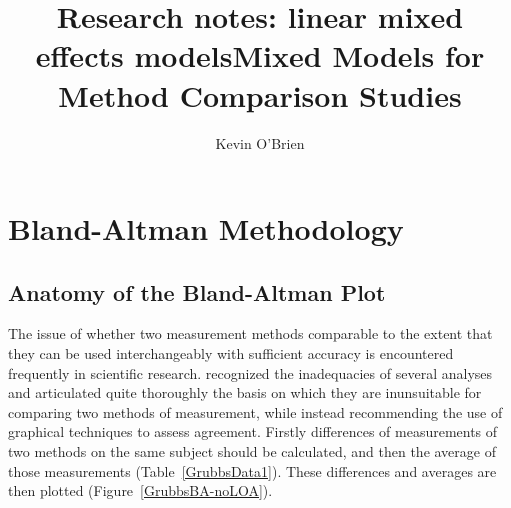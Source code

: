 \documentclass[12pt, a4paper]{report}
\title{Research notes: linear mixed effects models}
\author{ } \date{ }
\theoremstyle{plain}
\theoremstyle{definition}
\theoremstyle{remark}
\begin{document}
	\author{Kevin O'Brien}
	\title{Mixed Models for Method Comparison Studies}
	\tableofcontents
	
	\newpage
	\chapter{Bland-Altman Methodology}
	\section{Anatomy of the Bland-Altman Plot}
	
	The issue of whether two measurement methods comparable to the 	extent that they can be used interchangeably with sufficient accuracy is encountered frequently in scientific research. \citet{BA83} recognized the inadequacies of several analyses and articulated quite thoroughly the basis on which they are inunsuitable for comparing two methods of measurement, while instead recommending the use of graphical techniques to assess agreement. Firstly differences of measurements of two methods on the same subject should  be calculated, and then the average of those measurements
(Table~\ref{GrubbsData1}). These differences and averages are then plotted (Figure~\ref{GrubbsBA-noLOA}).

		
\end{document}
